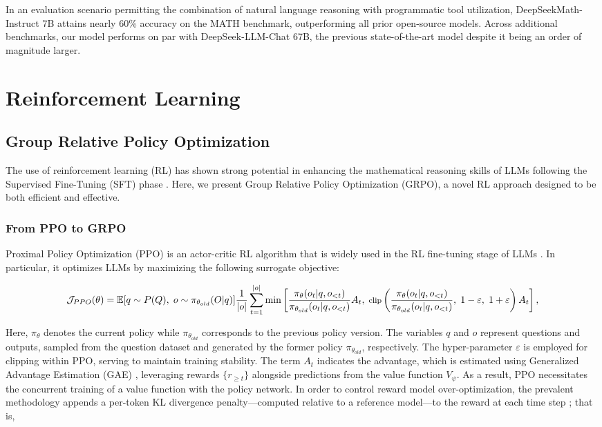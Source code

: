 \begin{itemize}[topsep=0pt]
\begin{itemize}[topsep=0pt]
In an evaluation scenario permitting the combination of natural language reasoning with programmatic tool utilization, DeepSeekMath-Instruct 7B attains nearly 60\% accuracy on the MATH benchmark, outperforming all prior open-source models. Across additional benchmarks, our model performs on par with DeepSeek-LLM-Chat 67B, the previous state-of-the-art model despite it being an order of magnitude larger.  
\section{Reinforcement Learning}

\subsection{Group Relative Policy Optimization} The use of reinforcement learning (RL) has shown strong potential in enhancing the mathematical reasoning skills of LLMs following the Supervised Fine-Tuning (SFT) phase \citep{wang2023math,wizardmath}. Here, we present Group Relative Policy Optimization (GRPO), a novel RL approach designed to be both efficient and effective.

\subsubsection{From PPO to GRPO} Proximal Policy Optimization (PPO) \citep{schulman2017proximal} is an actor-critic RL algorithm that is widely used in the RL fine-tuning stage of LLMs \citep{ouyang2022training}. In particular, it optimizes LLMs by maximizing the following surrogate objective:

\begin{equation}
\footnotesize
    \mathcal{J}_{PPO}(\theta) = \mathbb{E}{[q \sim P(Q),\ o \sim \pi_{\theta_{old}}(O|q)]} \frac{1}{|o|} \sum_{t=1}^{|o|} \min \left[ \frac{\pi_\theta(o_{t} | q, o_{<t})}{\pi_{\theta_{old}}(o_{t} | q, o_{<t})} A_{t},\ \text{clip} \left( \frac{\pi_\theta(o_{t} | q, o_{<t})}{\pi_{\theta_{old}}(o_{t} | q, o_{<t})},\ 1 - \varepsilon,\ 1 + \varepsilon \right) A_{t} \right],
\end{equation}

Here, $\pi_{\theta}$ denotes the current policy while $\pi_{\theta_{old}}$ corresponds to the previous policy version. The variables $q$ and $o$ represent questions and outputs, sampled from the question dataset and generated by the former policy $\pi_{\theta_{old}}$, respectively. The hyper-parameter $\varepsilon$ is employed for clipping within PPO, serving to maintain training stability. The term $A_t$ indicates the advantage, which is estimated using Generalized Advantage Estimation (GAE) \citep{gae}, leveraging rewards $\{r_{\ge t}\}$ alongside predictions from the value function $V_{\psi}$. As a result, PPO necessitates the concurrent training of a value function with the policy network. In order to control reward model over-optimization, the prevalent methodology appends a per-token KL divergence penalty—computed relative to a reference model—to the reward at each time step \citep{ouyang2022training}; that is,


\end{itemize}
\end{itemize}
